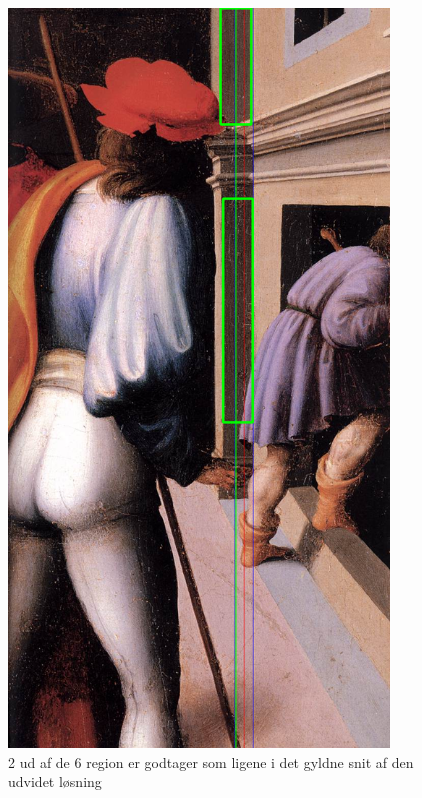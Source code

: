 \begin{figure}[h!!]
	\begin{center}
		\includegraphics[width=0.9\textwidth,angle=0]{afsnit/afprovning/billeder/udvidet_losning/udvidet_kfarver_sdetaljer.png}
	\end{center}
	\caption[]{2 ud af de 6 region er godtager som ligene i det gyldne snit af den udvidet løsning}
	\label{udvidet_virker1}
\end{figure}


